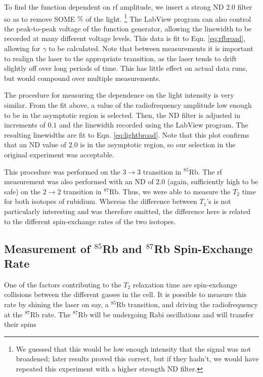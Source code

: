 To find the function dependent on rf amplitude, we insert a strong ND $2.0$ filter so as to remove SOME $\%$ of the light. \footnote{We guessed that this would be low enough intensity that the signal was not broadened; later results proved this correct, but if they hadn't, we would have repeated this experiment with a higher strength ND filter.} The LabView program can also control the peak-to-peak voltage of the function generator, allowing the linewidth to be recorded at many different voltage levels. This data is fit to Eqn. \ref{eq:rfbroad}, allowing for $\gamma$ to be calculated. Note that between measurements it is important to realign the laser to the appropriate transition, as the laser tends to drift slightly off over long periods of time. This has little effect on actual data runs, but would compound over multiple measurements.

The procedure for measuring the dependence on the light intensity is very similar. From the fit above, a value of the radiofrequency amplitude low enough to be in the asymptotic region is selected. Then, the ND filter is adjusted in increments of $0.1$ and the linewidth recorded using the LabView program. The resulting linewidths are fit to Eqn. \ref{eq:lightbroad}. Note that this plot confirms that an ND value of $2.0$ is in the asymptotic region, so our selection in the original experiment was acceptable.

This procedure was performed on the $3\rightarrow3$ transition in $^{85}$Rb. The rf measurement was also performed with an ND of $2.0$ (again, sufficiently high to be safe) on the $2\rightarrow2$ transition in $^{87}$Rb. Thus, we were able to measure the $T_{2}$ time for both isotopes of rubidium. Whereas the difference between $T_{1}$'s is not particularly interesting and was therefore omitted, the difference here is related to the different spin-exchange rates of the two isotopes.

\subsection{Measurement of $^{85}$Rb and $^{87}$Rb Spin-Exchange Rate}

One of the factors contributing to the $T_{2}$ relaxation time are spin-exchange collisions between the different gasses in the cell. It is possible to measure this rate by shining the laser on say, a $^{85}$Rb transition, and driving the radiofrequency at the $^{87}$Rb rate. The $^{87}$Rb will be undergoing Rabi oscillations and will transfer their spins

